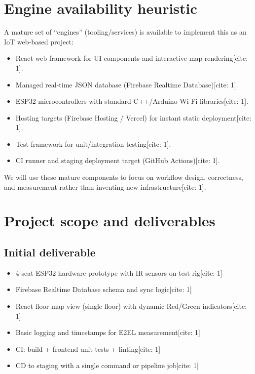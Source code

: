 \documentclass[11pt,a4paper]{article}
\begin{document}
\section{Engine availability heuristic}
A mature set of ``engines'' (tooling/services) is available to implement this as an IoT web-based project:
\begin{itemize}[leftmargin=0.7cm]
    \item React web framework for UI components and interactive map rendering[cite: 1].
    \item Managed real-time JSON database (Firebase Realtime Database)[cite: 1].
    \item ESP32 microcontrollers with standard C++/Arduino Wi-Fi libraries[cite: 1].
    \item Hosting targets (Firebase Hosting / Vercel) for instant static deployment[cite: 1].
    \item Test framework for unit/integration testing[cite: 1].
    \item CI runner and staging deployment target (GitHub Actions)[cite: 1].
\end{itemize}
We will use these mature components to focus on workflow design, correctness, and measurement rather than inventing new infrastructure[cite: 1].

\section{Project scope and deliverables}
\subsection{Initial deliverable}
\begin{itemize}[leftmargin=0.7cm]
    \item 4-seat ESP32 hardware prototype with IR sensors on test rig[cite: 1]
    \item Firebase Realtime Database schema and sync logic[cite: 1]
    \item React floor map view (single floor) with dynamic Red/Green indicators[cite: 1]
    \item Basic logging and timestamps for E2EL measurement[cite: 1]
    \item CI: build + frontend unit tests + linting[cite: 1]
    \item CD to staging with a single command or pipeline job[cite: 1]
\end{itemize}
\end{document}
